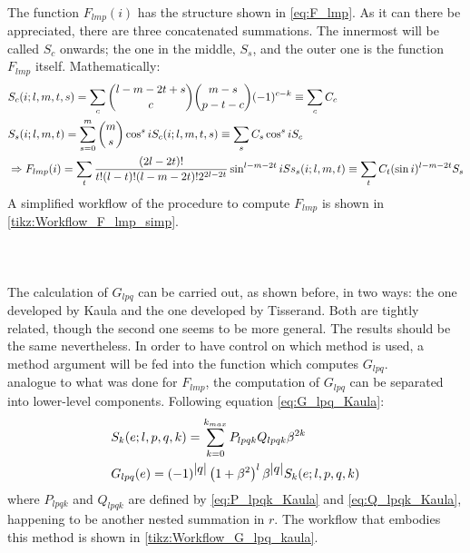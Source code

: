 			\paragraph{  \\}
			\indent The function $F_{lmp}(i)$ has the structure shown in \eqref{eq:F_lmp}. As it can there be appreciated, there are three concatenated summations. The innermost will be called $S_c$ onwards; the one in the middle, $S_s$, and the outer one is the function $F_{lmp}$ itself. Mathematically:
			\begin{align}
			& \label{eq:sumC} S_c(i; l, m, t, s) =  \displaystyle\sum_c  \dbinom{l - m - 2t + s}{c} \dbinom{m - s}{p - t- c} (-1)^{c - k}  \equiv \displaystyle\sum_{c} C_c\\
			& \label{eq:sumS} S_s(i; l, m, t) = \displaystyle\sum_{s = 0}^{m}  \dbinom{m}{s} \cos^s i S_c(i; l, m, t, s) \equiv \displaystyle\sum_{s} C_s \cos^s i S_c \\
			& \label{eq:F_lmp_Ss}\Rightarrow F_{lmp}(i) = \displaystyle\sum_t  \dfrac{(2l - 2t)!}{t! (l-t)! (l - m - 2t)! 2^{2l - 2t}} \sin^{l-m-2t} i Ss_s(i; l, m, t) \equiv\displaystyle\sum_{t} C_t (\sin i)^{l - m - 2t} S_s
			\end{align}
			\indent A simplified workflow of the procedure to compute $F_{lmp}$ is shown in \ref{tikz:Workflow_F_lmp_simp}. 
			
			\paragraph{ \\ }
			\indent The calculation of $G_{lpq}$ can be carried out, as shown before, in two ways: the one developed by Kaula and the one developed by Tisserand. Both are tightly related, though the second one seems to be more general. The results should be the same nevertheless. In order to have control on which method is used, a method argument will be fed into the function which computes $G_{lpq}$. \\
			\indent analogue to what was done for $F_{lmp}$, the computation of $G_{lpq}$ can be separated into lower-level components. Following equation \eqref{eq:G_lpq_Kaula}:
			\begin{align}
			& \label{eq:sum_k} S_k(e; l, p, q, k) = \displaystyle\sum_{k = 0}^{k_{max}} P_{lpqk} Q_{lpqk} \beta^{2k} \\
			& \label{eq:G_lpq_sum_k} G_{lpq}(e) = (-1)^{\mbox{$\left\lvert q \right\rvert$}}\left( 1 + \beta^2\right)^l \beta^{\mbox{$\left\lvert q \right\rvert$}} S_k(e; l, p, q, k) 
			\end{align}
			\noindent where $P_{lpqk}$ and $Q_{lpqk}$ are defined by \eqref{eq:P_lpqk_Kaula} and \eqref{eq:Q_lpqk_Kaula}, happening to be another nested summation in $r$. The workflow that embodies this method is shown in \ref{tikz:Workflow_G_lpq_kaula}.
			

